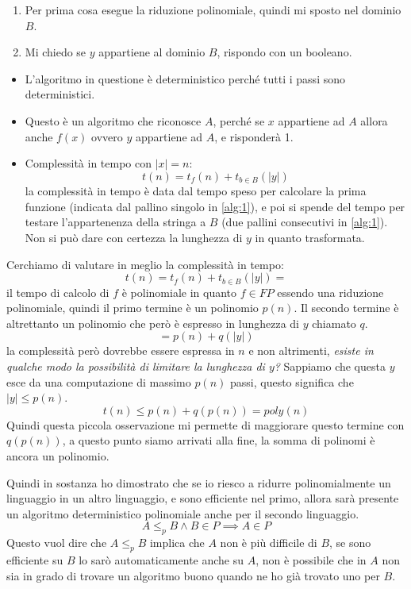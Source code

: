 \documentclass{article}
\begin{document}
\begin{enumerate}
    \item Per prima cosa esegue la riduzione polinomiale, quindi mi sposto nel dominio $B$.
    \item Mi chiedo se $y$ appartiene al dominio $B$, rispondo con un booleano.
\end{enumerate}

\begin{itemize}
    \item L'algoritmo in questione è deterministico perché tutti i passi sono deterministici.
    \item Questo è un algoritmo che riconosce $A$, perché se $x$ appartiene ad $A$ allora
    anche $f(x)$ ovvero $y$ appartiene ad $A$, e risponderà 1.
    \item Complessità in tempo con $|x|=n$:
    $$t(n)=t_f(n)+ t_{b\in B}(|y|)$$
    la complessità in tempo è data dal tempo speso per calcolare la prima funzione (indicata
    dal pallino singolo in \ref{alg:1}), e poi si spende del tempo per testare l'appartenenza della
    stringa a $B$ (due pallini consecutivi in \ref{alg:1}). Non si può dare con certezza
    la lunghezza di $y$ in quanto trasformata.
\end{itemize}

Cerchiamo di valutare in meglio la complessità in tempo:
$$t(n)=t_f(n)+t_{b\in B}(|y|)=$$
il tempo di calcolo di $f$ è polinomiale in quanto $f\in FP$ essendo una riduzione polinomiale,
quindi il primo termine è un polinomio $p(n)$. Il secondo termine è altrettanto un polinomio
che però è espresso in lunghezza di $y$ chiamato $q$.
$$=p(n)+q(|y|)$$
la complessità però dovrebbe essere espressa in $n$ e non altrimenti, \textit{esiste
in qualche modo la possibilità di limitare la lunghezza di $y$?} Sappiamo che questa
$y$ esce da una computazione di massimo $p(n)$ passi, questo significa che $|y|\leq p(n)$.
$$t(n)\leq p(n)+q(p(n))=poly(n)$$
Quindi questa piccola osservazione mi permette di maggiorare questo termine con $q(p(n))$,
a questo punto siamo arrivati alla fine, la somma di polinomi è ancora un polinomio.

Quindi in sostanza ho dimostrato che se io riesco a ridurre polinomialmente un linguaggio
in un altro linguaggio, e sono efficiente nel primo, allora sarà presente un algoritmo
deterministico polinomiale anche per il secondo linguaggio.
$$A\leq_p B\land B\in P\implies A\in P$$
Questo vuol dire che $A\leq_p B$ implica che $A$ non è più difficile di $B$, se sono efficiente
su $B$ lo sarò automaticamente anche su $A$, non è possibile che in $A$ non sia in grado
di trovare un algoritmo buono quando ne ho già trovato uno per $B$.
\end{document}
